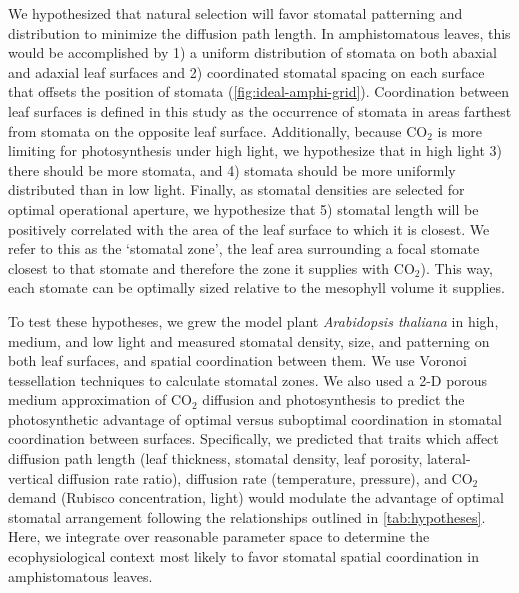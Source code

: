 \documentclass[12pt,halfline,a4paper,]{ouparticle}
\begin{document}
We hypothesized that natural selection will favor stomatal patterning
and distribution to minimize the diffusion path length. In
amphistomatous leaves, this would be accomplished by 1) a uniform
distribution of stomata on both abaxial and adaxial leaf surfaces and 2)
coordinated stomatal spacing on each surface that offsets the position
of stomata (\autoref{fig:ideal-amphi-grid}). Coordination between leaf
surfaces is defined in this study as the occurrence of stomata in areas
farthest from stomata on the opposite leaf surface. Additionally,
because CO\(_2\) is more limiting for photosynthesis under high light,
we hypothesize that in high light 3) there should be more stomata, and
4) stomata should be more uniformly distributed than in low light.
Finally, as stomatal densities are selected for optimal operational
aperture, we hypothesize that 5) stomatal length will be positively
correlated with the area of the leaf surface to which it is closest. We
refer to this as the `stomatal zone', the leaf area surrounding a focal
stomate closest to that stomate and therefore the zone it supplies with
CO\(_2\)). This way, each stomate can be optimally sized relative to the
mesophyll volume it supplies.

To test these hypotheses, we grew the model plant \emph{Arabidopsis
thaliana} in high, medium, and low light and measured stomatal density,
size, and patterning on both leaf surfaces, and spatial coordination
between them. We use Voronoi tessellation techniques to calculate
stomatal zones. We also used a 2-D porous medium approximation of
CO\(_2\) diffusion and photosynthesis to predict the photosynthetic
advantage of optimal versus suboptimal coordination in stomatal
coordination between surfaces. Specifically, we predicted that traits
which affect diffusion path length (leaf thickness, stomatal density,
leaf porosity, lateral-vertical diffusion rate ratio), diffusion rate
(temperature, pressure), and CO\(_2\) demand (Rubisco concentration,
light) would modulate the advantage of optimal stomatal arrangement
following the relationships outlined in \autoref{tab:hypotheses}. Here,
we integrate over reasonable parameter space to determine the
ecophysiological context most likely to favor stomatal spatial
coordination in amphistomatous leaves.
\end{document}
